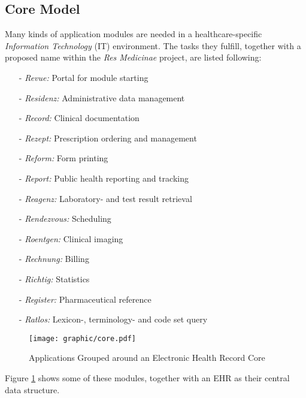 %
%
%
%
%
%
%

\subsection{Core Model}
\label{core_model_heading}

Many kinds of application modules are needed in a healthcare-specific
\emph{Information Technology} (IT) environment. The tasks they fulfill,
together with a proposed name within the \emph{Res Medicinae} project, are
listed following:

\begin{itemize}
    \item[-] \emph{Revue:} Portal for module starting
    \item[-] \emph{Residenz:} Administrative data management
    \item[-] \emph{Record:} Clinical documentation
    \item[-] \emph{Rezept:} Prescription ordering and management
    \item[-] \emph{Reform:} Form printing
    \item[-] \emph{Report:} Public health reporting and tracking
    \item[-] \emph{Reagenz:} Laboratory- and test result retrieval
    \item[-] \emph{Rendezvous:} Scheduling
    \item[-] \emph{Roentgen:} Clinical imaging
    \item[-] \emph{Rechnung:} Billing
    \item[-] \emph{Richtig:} Statistics
    \item[-] \emph{Register:} Pharmaceutical reference
    \item[-] \emph{Ratlos:} Lexicon-, terminology- and code set query
\end{itemize}

\begin{figure}[ht]
    \begin{center}
        \texttt{[image: graphic/core.pdf]}
        \caption{Applications Grouped around an Electronic Health Record Core}
        \label{core_figure}
    \end{center}
\end{figure}

Figure \ref{core_figure} shows some of these modules, together with an EHR as
their central data structure.
